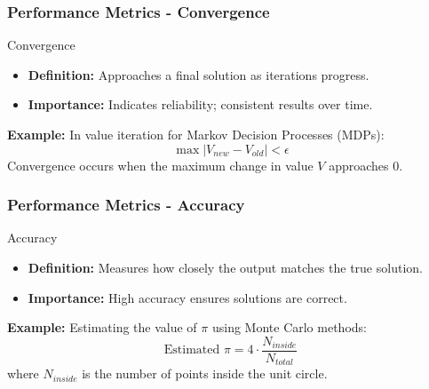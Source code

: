 \documentclass[aspectratio=169]{beamer}
\begin{document}
\begin{frame}[fragile]
    \frametitle{Performance Metrics - Convergence}
    \begin{block}{Convergence}
        \begin{itemize}
            \item \textbf{Definition:} Approaches a final solution as iterations progress.
            \item \textbf{Importance:} Indicates reliability; consistent results over time.
        \end{itemize}
        
        \textbf{Example:} In value iteration for Markov Decision Processes (MDPs):
        \begin{equation}
            \max |V_{new} - V_{old}| < \epsilon
        \end{equation}
        Convergence occurs when the maximum change in value \(V\) approaches 0.
    \end{block}
\end{frame}

\begin{frame}[fragile]
    \frametitle{Performance Metrics - Accuracy}
    \begin{block}{Accuracy}
        \begin{itemize}
            \item \textbf{Definition:} Measures how closely the output matches the true solution.
            \item \textbf{Importance:} High accuracy ensures solutions are correct.
        \end{itemize}
        
        \textbf{Example:} Estimating the value of $\pi$ using Monte Carlo methods:
        \begin{equation}
            \text{Estimated } \pi = 4 \cdot \frac{N_{inside}}{N_{total}}
        \end{equation}
        where \(N_{inside}\) is the number of points inside the unit circle.
    \end{block}
\end{frame}
\end{document}
